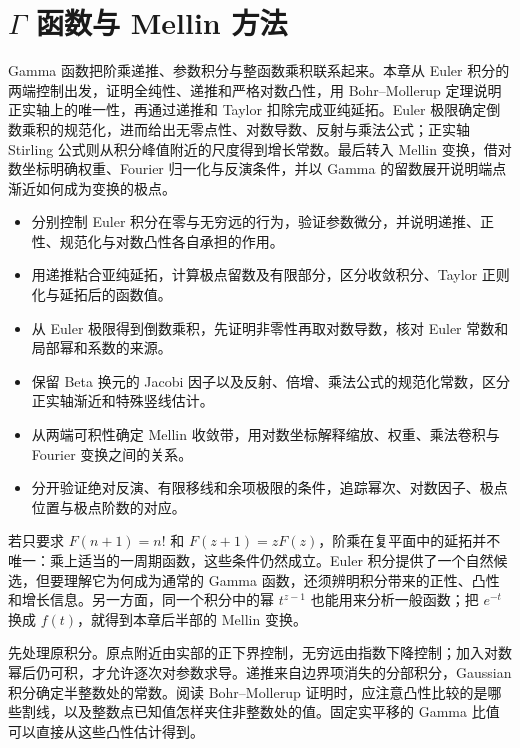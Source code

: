 \chapter{\texorpdfstring{\(\Gamma\)}{\AnalysisPdfGamma} 函数与 Mellin 方法}
\label{b3:ch:21}
\begin{chapterabstract}
Gamma 函数把阶乘递推、参数积分与整函数乘积联系起来。本章从 Euler 积分的两端控制出发，证明全纯性、递推和严格对数凸性，用 Bohr--Mollerup 定理说明正实轴上的唯一性，再通过递推和 Taylor 扣除完成亚纯延拓。Euler 极限确定倒数乘积的规范化，进而给出无零点性、对数导数、反射与乘法公式；正实轴 Stirling 公式则从积分峰值附近的尺度得到增长常数。最后转入 Mellin 变换，借对数坐标明确权重、Fourier 归一化与反演条件，并以 Gamma 的留数展开说明端点渐近如何成为变换的极点。
\end{chapterabstract}

\begin{learninggoals}
\begin{itemize}
\item 分别控制 Euler 积分在零与无穷远的行为，验证参数微分，并说明递推、正性、规范化与对数凸性各自承担的作用。
\item 用递推粘合亚纯延拓，计算极点留数及有限部分，区分收敛积分、Taylor 正则化与延拓后的函数值。
\item 从 Euler 极限得到倒数乘积，先证明非零性再取对数导数，核对 Euler 常数和局部幂和系数的来源。
\item 保留 Beta 换元的 Jacobi 因子以及反射、倍增、乘法公式的规范化常数，区分正实轴渐近和特殊竖线估计。
\item 从两端可积性确定 Mellin 收敛带，用对数坐标解释缩放、权重、乘法卷积与 Fourier 变换之间的关系。
\item 分开验证绝对反演、有限移线和余项极限的条件，追踪幂次、对数因子、极点位置与极点阶数的对应。
\end{itemize}
\end{learninggoals}

若只要求 \(F(n+1)=n!\) 和 \(F(z+1)=zF(z)\)，阶乘在复平面中的延拓并不唯一：乘上适当的一周期函数，这些条件仍然成立。Euler 积分提供了一个自然候选，但要理解它为何成为通常的 Gamma 函数，还须辨明积分带来的正性、凸性和增长信息。另一方面，同一个积分中的幂 \(t^{z-1}\) 也能用来分析一般函数；把 \(e^{-t}\) 换成 \(f(t)\)，就得到本章后半部的 Mellin 变换。

\ProseParagraphBreak
{}先处理原积分。原点附近由实部的正下界控制，无穷远由指数下降控制；加入对数幂后仍可积，才允许逐次对参数求导。递推来自边界项消失的分部积分，Gaussian 积分确定半整数处的常数。阅读 Bohr--Mollerup 证明时，应注意凸性比较的是哪些割线，以及整数点已知值怎样夹住非整数处的值。固定实平移的 Gamma 比值可以直接从这些凸性估计得到。

